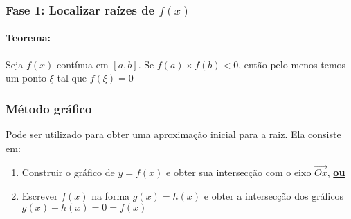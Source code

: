 \documentclass{article}
\begin{document}
        \subsubsection{Fase 1: Localizar raízes de $f(x)$}
        \paragraph{Teorema:} Seja $f(x)$ contínua em $[a,b]$. Se $f(a) \times f(b) < 0$, então pelo menos temos um ponto $\xi$ tal que $f(\xi) = 0$


        \subsubsection*{Método gráfico}
        Pode ser utilizado para obter uma aproximação inicial para a raiz. Ela consiste em:

        \begin{enumerate}
            \item Construir o gráfico de $y=f(x)$ e obter sua intersecção com o eixo $\vec{Ox}$, \textbf{\underline{ou}}
            \item Escrever $f(x)$ na forma $g(x) = h(x)$ e obter a intersecção dos gráficos $g(x) - h(x) = 0 = f(x)$
        \end{enumerate}
\end{document}
